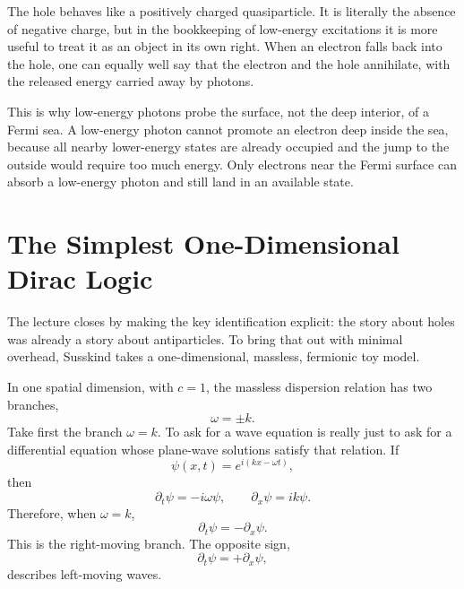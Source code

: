The hole behaves like a positively charged quasiparticle. It is literally the absence of negative charge, but in the bookkeeping of low-energy excitations it is more useful to treat it as an object in its own right. When an electron falls back into the hole, one can equally well say that the electron and the hole annihilate, with the released energy carried away by photons.

This is why low-energy photons probe the surface, not the deep interior, of a Fermi sea. A low-energy photon cannot promote an electron deep inside the sea, because all nearby lower-energy states are already occupied and the jump to the outside would require too much energy. Only electrons near the Fermi surface can absorb a low-energy photon and still land in an available state.

\section{The Simplest One-Dimensional Dirac Logic}

The lecture closes by making the key identification explicit: the story about holes was already a story about antiparticles. To bring that out with minimal overhead, Susskind takes a one-dimensional, massless, fermionic toy model.

In one spatial dimension, with \(c=1\), the massless dispersion relation has two branches,
\begin{equation}
\omega=\pm k.
\end{equation}
Take first the branch \(\omega=k\). To ask for a wave equation is really just to ask for a differential equation whose plane-wave solutions satisfy that relation. If
\begin{equation}
\psi(x,t)=e^{i(kx-\omega t)},
\end{equation}
then
\begin{equation}
\partial_t\psi=-i\omega \psi,
\qquad
\partial_x\psi=ik\psi.
\end{equation}
Therefore, when \(\omega=k\),
\begin{equation}
\partial_t\psi=-\partial_x\psi.
\end{equation}
This is the right-moving branch. The opposite sign,
\begin{equation}
\partial_t\psi=+\partial_x\psi,
\end{equation}
describes left-moving waves.

